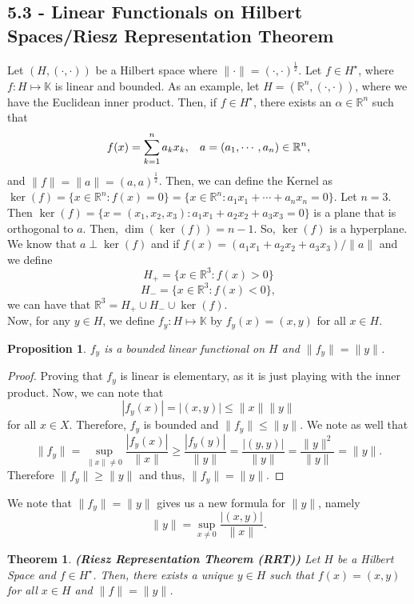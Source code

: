 \documentclass[12pt]{article}
\newtheorem{theorem}{Theorem}
\newtheorem{proposition}{Proposition}
\newcommand{\R}{{\mathbb R}}
\def\K{\mathbb{K}}
\newcommand{\Hs}{H^{\star}}
\newcommand{\inner}{(\cdot, \cdot)}
\begin{document}
\subsection*{5.3 - Linear Functionals on Hilbert Spaces/Riesz Representation Theorem}
Let $(H, \inner)$ be a Hilbert space where $\| \cdot \| = \inner^{\frac{1}{2}}$. Let $f \in \Hs$, where $f: H \mapsto \K$ is linear and bounded. As an example, let $H = (\R^n, \inner)$, where we have the Euclidean inner product. Then, if $f \in \Hs$, there exists an $\alpha \in \R^n$ such that 
\[ f(x) = \sum\limits_{k = 1}^n a_k x_k, \hspace{3mm} a = (a_1, \cdots, a_n) \in \R^n,\]
and $\| f \| = \| a \| = (a, a)^{\frac{1}{2}}$. Then, we can define the Kernel as $\ker(f) = \{ x \in \R^n : f(x) = 0 \} = \{ x \in \R^n : a_1 x_1 + \cdots + a_n x_n = 0 \}$. Let $n = 3$. Then $\ker(f) = \{ x = (x_1, x_2, x_3) : a_1 x_1 + a_2 x_2 + a_3 x_3 = 0 \}$ is a plane that is orthogonal to $a$. Then, $\dim(\ker(f)) = n - 1$. So, $\ker(f)$ is a hyperplane. We know that $a \perp \ker(f)$ and if $f(x) = (a_1 x_1 + a_2 x_2 + a_3 x_3)/\| a \|$ and we define 
\[ H_+ = \{ x \in \R^3 : f(x) > 0 \}\]
\[ H_- = \{ x \in \R^3 : f(x) < 0 \},\]
we can have that $\R^3 = H_+ \cup H_- \cup \ker(f)$. \\
\indent Now, for any $y \in H$, we define $f_y: H \mapsto \K$ by $f_y(x) = (x, y)$ for all $x \in H$.
\begin{proposition}
$f_y$ is a bounded linear functional on $H$ and $\| f_y \| = \| y \|$.
\end{proposition}
\vspace{-25pt}
\begin{proof}
Proving that $f_y$ is linear is elementary, as it is just playing with the inner product. Now, we can note that 
\[ |f_y(x)| = |(x, y) | \leq \| x \| \| y\| \]
for all $x \in X$. Therefore, $f_y$ is bounded and $\| f_y \| \leq \| y \|$. We note as well that 
\[ \| f_y \| = \sup\limits_{ \| x \| \neq 0 } \frac{|f_y(x)|}{\| x \|} \geq \frac{|f_y(y)|}{\| y \|} = \frac{|(y, y)|}{\| y \|} = \frac{\| y\|^2}{\| y \|} = \| y\|.\]
Therefore $\| f_y \| \geq \| y \|$ and thus, $\| f_y \| = \| y \|$. 
\end{proof}
\vspace{-25pt}
We note that $\| f_y \| = \| y \|$ gives us a new formula for $\| y\|$, namely 
\[ \| y \| = \sup\limits_{x \neq 0} \frac{|(x, y)|}{\| x \|}.\]
\begin{theorem}
\textbf{(Riesz Representation Theorem (RRT))} Let $H$ be a Hilbert Space and $f \in \Hs$. Then, there exists a unique $y \in H$ such that $f(x) = (x, y)$ for all $x \in H$ and $\| f \| = \| y\|$. 
\end{theorem}
\end{document}
